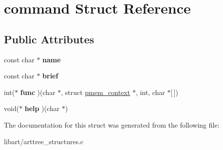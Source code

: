 \hypertarget{structcommand}{}\section{command Struct Reference}
\label{structcommand}
\subsection*{Public Attributes}
\begin{DoxyCompactItemize}
\item 
\mbox{\label{structcommand_abe8e2307ef5e2b469ce227af336b3a78}} 
const char $\ast$ {\bfseries name}
\item 
\mbox{\label{structcommand_a9eebac54783247ee795dc7e6196240bd}} 
const char $\ast$ {\bfseries brief}
\item 
\mbox{\label{structcommand_a0021992c3299e1d70188894548f51b58}} 
int($\ast$ {\bfseries func} )(char $\ast$, struct \hyperlink{structpmem__context}{pmem\+\_\+context} $\ast$, int, char $\ast$\mbox{[}$\,$\mbox{]})
\item 
\mbox{\label{structcommand_a43ee7e284b376499a99a5fa2d4905e92}} 
void($\ast$ {\bfseries help} )(char $\ast$)
\end{DoxyCompactItemize}


The documentation for this struct was generated from the following file\+:\begin{DoxyCompactItemize}
\item 
libart/arttree\+\_\+structures.\+c\end{DoxyCompactItemize}
